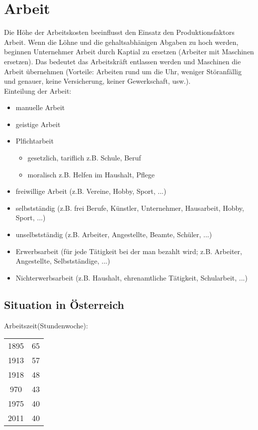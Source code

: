 \documentclass[a4paper]{report}
\begin{document}
\section{Arbeit}
Die Höhe der Arbeitskosten beeinflusst den Einsatz den Produktionsfaktors Arbeit. Wenn die Löhne und die gehaltsabhänigen Abgaben zu hoch werden, beginnen Unternehmer Arbeit durch Kaptial zu ersetzen (Arbeiter mit Maschinen ersetzen). Das bedeutet das Arbeitskräft entlassen werden und Maschinen die Arbeit übernehmen (Vorteile: Arbeiten rund um die Uhr, weniger Störanfällig und genauer, keine Versicherung, keiner Gewerkschaft, usw.).\\
Einteilung der Arbeit:
\begin{itemize}
\item manuelle Arbeit
\item geistige Arbeit\\
\item Plfichtarbeit
	\begin{itemize}
	\item gesetzlich, tariflich z.B. Schule, Beruf
	\item moralisch z.B. Helfen im Haushalt, Pflege
	\end{itemize}
\item freiwillige Arbeit (z.B. Vereine, Hobby, Sport, ...)

\item selbstständig (z.B. frei Berufe, Künstler, Unternehmer, Hausarbeit, Hobby, Sport, ...)
\item unselbstständig (z.B. Arbeiter, Angestellte, Beamte, Schüler, ...)

\item Erwerbsarbeit (für jede Tätigkeit bei der man bezahlt wird; z.B. Arbeiter, Angestellte, Selbstständige, ...)
\item Nichterwerbsarbeit (z.B. Haushalt, ehrenamtliche Tätigkeit, Schularbeit, ...)
\end{itemize}

\subsection{Situation in Österreich}

Arbeitszeit(Stundenwoche):

\begin{tabular}{c|c}
\\1895 & 65
\\1913 & 57
\\1918 & 48
\\970 & 43 
\\1975 & 40
\\2011 & 40

\end{tabular}
\end{document}
